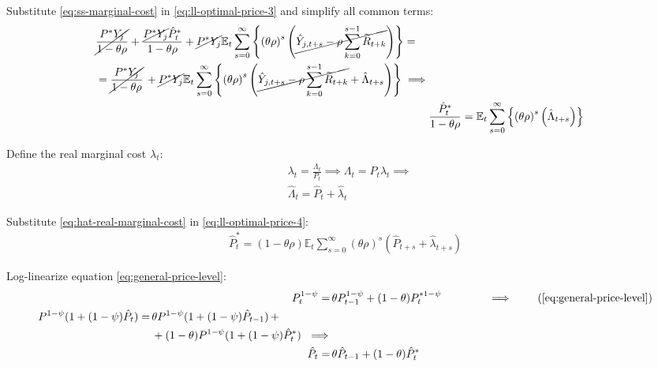 \documentclass[
	12pt, 
	]{article}
\numberwithin{equation}{section}
\newcommand{\E}[1][t]{{\mathbb{E}_{#1}}}
\theoremstyle{definition}
\theoremstyle{plain}
\theoremstyle{plain}
\theoremstyle{plain}
\begin{document}
Substitute \ref{eq:ss-marginal-cost} in \ref{eq:ll-optimal-price-3} and simplify all common terms:
\begin{align}
	\begin{split}
		& \cancel{\frac{P^\ast Y_{j}}{1-\theta\rho}} + \frac{ \cancel{P^\ast Y_{j}} \hat{P}_t^\ast }{1- \theta \rho} + \cancel{P^\ast Y_{j}} \E \sum_{s=0}^{\infty} \left\{ \left( \theta \rho \right)^s \left( \cancel{\hat{Y}_{j,t+s} - \rho \sum_{k=0}^{s-1} \widetilde{R}_{t+k}} \right) \right\} = 
	\\
		& = \cancel{\frac{P^\ast Y_{j}}{1-\theta\rho}} \, + \cancel{P^\ast Y_{j}} \E \sum_{s=0}^{\infty} \left\{ \left( \theta \rho \right)^s \left( \cancel{\hat{Y}_{j,t+s} - \rho \sum_{k=0}^{s-1} \widetilde{R}_{t+k}} + \hat{\Lambda}_{t+s} \right) \right\} \implies	
	\end{split} \nonumber \\
	& \frac{ \hat{P}_t^\ast }{1- \theta \rho} = \E \sum_{s=0}^{\infty} \left\{ \left( \theta \rho \right)^s \left( \hat{\Lambda}_{t+s} \right) \right\} \label{eq:ll-optimal-price-4}
\end{align}

Define the real marginal cost $\lambda_t$:
\begin{align}
	& \lambda_t = \frac{\Lambda_t}{P_t} \implies \Lambda_t = P_t \lambda_t \implies \nonumber \\
	& \hat{\Lambda}_t = \hat{P}_t + \hat{\lambda}_t \label{eq:hat-real-marginal-cost}
\end{align}

Substitute \ref{eq:hat-real-marginal-cost} in \ref{eq:ll-optimal-price-4}:
\begin{align}
	\hat{P}_t^\ast = (1- \theta \rho) \E \sum_{s=0}^{\infty} \left( \theta \rho \right)^s \left( \hat{P}_{t+s} + \hat{\lambda}_{t+s} \right) \label{eq:ll-optimal-price-5}
\end{align}

Log-linearize equation \ref{eq:general-price-level}:
\begin{align}
	P_t^{1-\psi} =\, &\theta P_{t-1}^{1-\psi} + (1-\theta) P_t^{\ast 1-\psi} \qquad \qquad \implies \tag{\ref{eq:general-price-level}} \\
	\begin{split} P^{1-\psi} (1 + (1-\psi)\hat{P}_t) =\, &\theta P^{1-\psi} (1 + (1-\psi)\hat{P}_{t-1}) \, + \\ & + (1-\theta) P^{1-\psi} (1 + (1-\psi)\hat{P}_t^\ast) \ \implies \nonumber \end{split} \\
	\hat{P}_t =\, &\theta \hat{P}_{t-1} + (1-\theta) \hat{P}_t^\ast
	\label{eq:ll-general-price-level}
\end{align}
\end{document}
